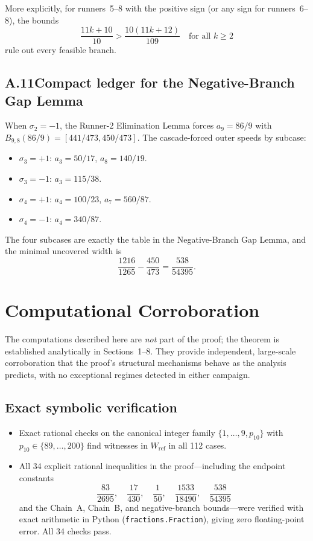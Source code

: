 \documentclass[12pt,a4paper]{amsart}
\theoremstyle{definition}
\theoremstyle{remark}
\newcommand{\Wref}{W_{\mathrm{ref}}}
\begin{document}
More explicitly, for runners~5--8 with the positive sign (or any sign for runners~6--8),
the bounds
\[
  \frac{11k+10}{10} > \frac{10(11k+12)}{109}\quad\text{for all }k\ge 2
\]
rule out every feasible branch.

\subsection*{A.11\quad Compact ledger for the Negative-Branch Gap Lemma}

When $\sigma_2=-1$, the Runner-2 Elimination Lemma forces $a_9=86/9$ with
$B_{9,8}(86/9)=[441/473,450/473]$. The cascade-forced outer speeds by subcase:

\begin{itemize}
  \item $\sigma_3=+1$: $a_3=50/17$, $a_8=140/19$.
  \item $\sigma_3=-1$: $a_3=115/38$.
  \item $\sigma_4=+1$: $a_4=100/23$, $a_7=560/87$.
  \item $\sigma_4=-1$: $a_4=340/87$.
\end{itemize}

The four subcases are exactly the table in the Negative-Branch Gap Lemma, and the
minimal uncovered width is
\[
  \frac{1216}{1265} - \frac{450}{473} = \frac{538}{54395}.
\]

\section{Computational Corroboration}

The computations described here are \emph{not} part of the proof; the theorem is
established analytically in Sections~1--8.  They provide independent, large-scale
corroboration that the proof's structural mechanisms behave as the analysis predicts,
with no exceptional regimes detected in either campaign.

\subsection*{Exact symbolic verification}

\begin{itemize}
  \item Exact rational checks on the canonical integer family $\{1,\ldots,9,p_{10}\}$
        with $p_{10}\in\{89,\ldots,200\}$ find witnesses in $\Wref$ in all 112 cases.
  \item All 34 explicit rational inequalities in the proof---including the endpoint
        constants
        \[
          \frac{83}{2695},\quad\frac{17}{430},\quad\frac{1}{50},\quad
          \frac{1533}{18490},\quad\frac{538}{54395}
        \]
        and the Chain~A, Chain~B, and negative-branch bounds---were verified with
        exact arithmetic in Python (\texttt{fractions.Fraction}), giving zero
        floating-point error.  All 34 checks pass.
\end{itemize}
\end{document}
